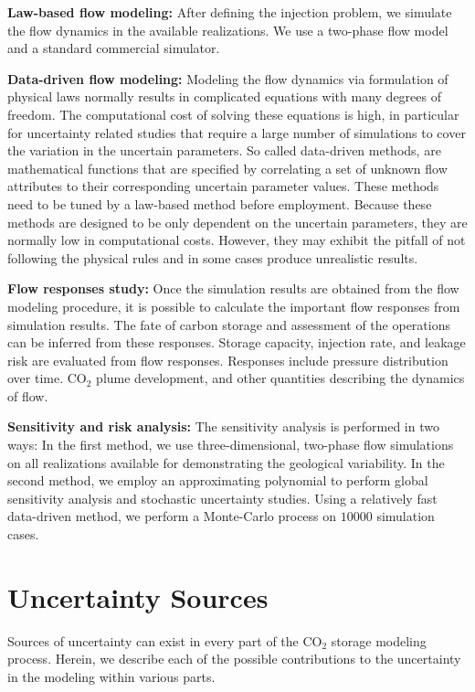 \textbf{Law-based flow modeling:} After defining the injection problem, we
simulate the flow dynamics in the available realizations. We use a two-phase flow model and a standard commercial simulator.


\textbf{Data-driven flow modeling:} Modeling the flow dynamics via formulation
of physical laws normally results in complicated equations with many degrees of
freedom. The computational cost of solving these equations is high, in
particular for uncertainty related studies that require
a large number of simulations to cover the variation in the uncertain
parameters. So called data-driven methods, are mathematical functions that are specified by correlating a set of unknown flow attributes to their corresponding uncertain parameter values. These methods need to be tuned by a law-based method before employment. Because these methods are designed to be only dependent on the uncertain parameters, they are normally low in computational costs. However, they may exhibit the pitfall of not following the physical rules and in some cases produce unrealistic results. 


\textbf{Flow responses study:} Once the simulation results are obtained from the
flow modeling procedure, it is possible to calculate the important flow
responses from simulation results. The fate of carbon storage and assessment of
the operations can be inferred from these responses. Storage capacity, injection rate, and leakage risk are evaluated from flow responses. Responses include pressure distribution over time. $\mbox{CO}_2$ plume development, and other quantities describing the dynamics of flow. 

\textbf{Sensitivity and risk analysis:} The sensitivity analysis is performed
in two ways: In the first method, we use three-dimensional, two-phase flow simulations on all realizations available for demonstrating the geological variability. In the second method, we employ an
approximating polynomial to perform global sensitivity analysis and
stochastic uncertainty studies. Using a relatively fast data-driven method,
we perform a Monte-Carlo process on $10000$ simulation cases. 

\section{Uncertainty Sources}
\label{uncertaintySources}

Sources of uncertainty can exist in every part of the $\mbox{CO}_2$ storage modeling
process. Herein, we describe each of the possible contributions to the
uncertainty in the modeling within various parts.

